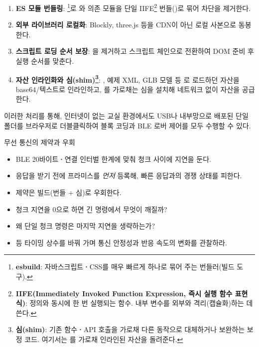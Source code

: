 \begin{enumerate}
  \item \textbf{ES 모듈 번들링}: \footnote{\textbf{esbuild}: 자바스크립트\textbf{·}CSS를
        매우 빠르게 하나로 묶어 주는 번들러(빌드 도구).}로 와 의존 모듈을
        단일 IIFE\footnote{\textbf{IIFE(Immediately Invoked Function Expression, 즉시 실행 함수
        표현식)}: 정의와 동시에 한 번 실행되는 함수. 내부 변수를 외부와 격리(캡슐화)하는 데 쓴다.}
        번들()로 묶어  차단을 제거한다.
  \item \textbf{외부 라이브러리 로컬화}: Blockly, three.js 등을 CDN이 아닌
         로컬 사본으로 동봉한다.
  \item \textbf{스크립트 로딩 순서 보장}: 을 제거하고
         스크립트 체인으로 전환하여 DOM 준비 후 실행 순서를 맞춘다.
  \item \textbf{자산 인라인화와  심(shim)\footnote{\textbf{심(shim)}: 기존 함수\textbf{·}API
        호출을 가로채 다른 동작으로 대체하거나 보완하는 보정 코드. 여기서는 를
        가로채 인라인된 자산을 돌려준다.}}: ,
        예제 XML, GLB 모델 등 로 로드하던 자산을 base64/텍스트로
        인라인하고, 를 가로채는 심을 설치해 네트워크 없이
        자산을 공급한다.
\end{enumerate}

이러한 처리를 통해, 인터넷이 없는 교실 환경에서도 USB나 내부망으로 배포된
단일 폴더를 브라우저로 더블클릭하여 블록 코딩과 BLE 로버 제어를 모두 수행할
수 있다.

\begin{teachbox}{무선 통신의 제약과 우회}
\begin{itemize}
  \item BLE 20바이트\textbf{·}연결 인터벌 한계에 맞춰 청크 사이에 지연을 둔다.
  \item 응답을 받기 전에 프라미스를 \emph{먼저} 등록해, 빠른 응답과의 경쟁 상태를 피한다.
  \item {} 제약은 빌드(번들 + 심)로 우회한다.
\end{itemize}
\begin{itemize}
  \item 청크 지연을 0으로 하면 긴 명령에서 무엇이 깨질까?
  \item 왜 단일 청크 명령은 마지막 지연을 생략하는가?
\end{itemize}
\begin{itemize}
  \item {} 등 타이밍 상수를 바꿔 가며 통신 안정성과 반응 속도의 변화를 관찰하라.
\end{itemize}
\end{teachbox}

